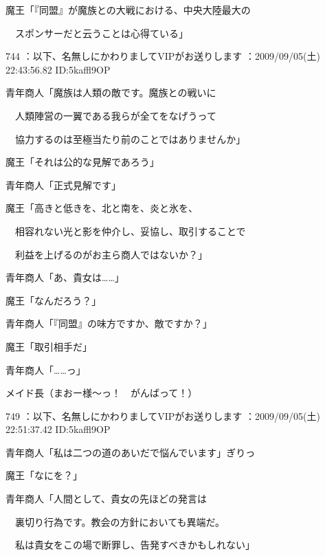 \documentclass[a4j,twocolumn]{tarticle}
\begin{document}
魔王「『同盟』が魔族との大戦における、中央大陸最大の\par{} 
　スポンサーだと云うことは心得ている」 

	
    
    

744 ：以下、名無しにかわりましてVIPがお送りします ：2009/09/05(土) 22:43:56.82 ID:5kaffl9OP 


青年商人「魔族は人類の敵です。魔族との戦いに\par{} 
　人類陣営の一翼である我らが全てをなげうって\par{} 
　協力するのは至極当たり前のことではありませんか」 



魔王「それは公的な見解であろう」\par{} 
青年商人「正式見解です」 



魔王「高きと低きを、北と南を、炎と氷を、 \par{}
　相容れない光と影を仲介し、妥協し、取引することで\par{} 
　利益を上げるのがお主ら商人ではないか？」 



青年商人「あ、貴女は……」 



魔王「なんだろう？」 



青年商人「『同盟』の味方ですか、敵ですか？」 



魔王「取引相手だ」 



青年商人「……っ」 



メイド長（まおー様～っ！　がんばって！） 

	
    
    

749 ：以下、名無しにかわりましてVIPがお送りします ：2009/09/05(土) 22:51:37.42 ID:5kaffl9OP 


青年商人「私は二つの道のあいだで悩んでいます」ぎりっ\par{} 
魔王「なにを？」 



青年商人「人間として、貴女の先ほどの発言は\par{} 
　裏切り行為です。教会の方針においても異端だ。\par{} 
　私は貴女をこの場で断罪し、告発すべきかもしれない」 
\end{document}
